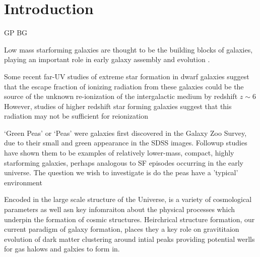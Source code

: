 \documentclass[12pt]{article}
\begin{document}



\begin{abstract}
\end{abstract}


\section{Introduction}
\label{sec:intro}

GP BG
 
Low mass starforming galaxies are thought to be the building blocks of galaxies, playing an important role in early galaxy assembly and evolution \citep{Pillepich2015}.

Some recent far-UV studies of extreme star formation in dwarf galaxies suggest that the escape fraction of ionizing radiation from these galaxies could be the source of the unknown re-ionization of the intergalactic medium by redshift $z\sim6$ \citep{erb2016,Izotovetal2016}
However, studies of higher redshift star forming galaxies suggest that this radiation may not be sufficient for reionization \citep{Rutkowski2017,Grazian2017, Rutkowski2016}

`Green Peas' or `Peas' were galaxies first discovered in the Galaxy Zoo Survey, due to their small and green appearance in the SDSS images.
Followup studies have shown them to be examples of relatively lower-mass, compact, highly starforming galaxies, perhaps analogous to SF episodes occurring in the early universe.
The question we wish to investigate is do the peas have a 'typical' environment

Encoded in the large scale structure of the Universe, is a variety of cosmological parameters as well asn key infomraiton about the physical processes which underpin the formation of cosmic structures.
Heirchrical structure formation, our current paradigm of galaxy formation, places they a key role on gravititaion evolution of dark matter clustering around intial peaks providing potential werlls for gas halows and galxies to form in.
\end{document}
